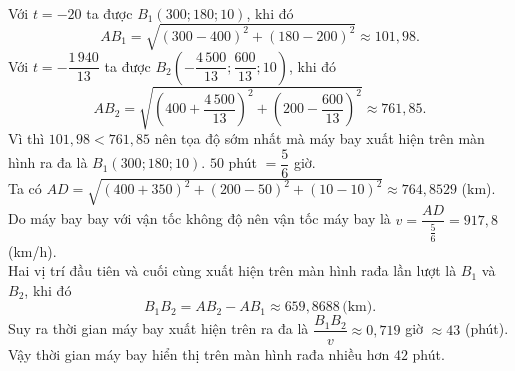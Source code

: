 \begin{ex}
{\begin{itemchoice}
\begin{eqnarray*}
            \end{eqnarray*}
            Với $t=-20$ ta được $B_1(300;180;10)$, khi đó
            $$AB_1=\sqrt{(300-400)^2+(180-200)^2}\approx 101{,}98.$$
            Với $t=-\dfrac{1\,940}{13}$ ta được $B_2\left(-\dfrac{4\,500}{13};\dfrac{600}{13};10\right)$, khi đó
            $$AB_2=\sqrt{\left(400+\dfrac{4\,500}{13}\right)^2+\left(200-\dfrac{600}{13}\right)^2}\approx 761{,}85.$$
            Vì thì $101{,}98<761{,}85$ nên tọa độ sớm nhất mà máy bay xuất hiện trên màn hình ra đa là $B_1(300;180;10)$.
            \itemch $50$ phút $=\dfrac{5}{6}$ giờ.\\
            Ta có $AD=\sqrt{(400+350)^2+(200-50)^2+(10-10)^2}\approx 764{,}8529$ (km).\\
            Do máy bay bay với vận tốc không độ nên vận tốc máy bay là $v=\dfrac{AD}{\tfrac{5}{6}}=917{,}8$ (km/h).\\
            Hai vị trí đầu tiên và cuối cùng xuất hiện trên màn hình rađa lần lượt là $B_1$ và $B_2$, khi đó
            $$B_1B_2=AB_2-AB_1\approx 659{,}8688\,\text{(km)}.$$
            Suy ra thời gian máy bay xuất hiện trên ra đa là $\dfrac{B_1B_2}{v}\approx 0{,}719$ giờ $\approx 43$ (phút).\\
            Vậy thời gian máy bay hiển thị trên màn hình rađa nhiều hơn $42$ phút.
        \end{itemchoice}
    }
\end{ex}
